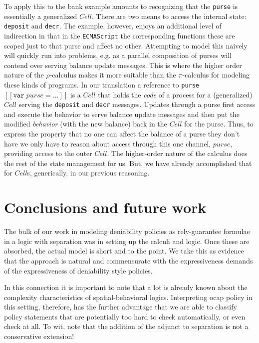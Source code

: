 \documentclass[]{amsart}
\newcommand{\ldb}{[\![}
\newcommand{\rdb}{]\!]}
\newcommand{\meaningof}[1]{\ldb #1 \rdb}
\theoremstyle{definition}
\theoremstyle{remark}
\numberwithin{equation}{subsection}
\newcommand{\pic}{$\pi$-calculus}
\newcommand{\rhoc}{$\rho$-calculus}
\begin{document}
To apply this to the bank example amounts to recognizing that the
\texttt{purse} is essentially a generalized $Cell$. There are two
means to access the internal state: \texttt{deposit} and
\texttt{decr}. The example, however, enjoys an additional level of
indirection in that in the \texttt{ECMAScript} the corresponding
functions these are scoped just to that purse and affect no
other. Attempting to model this naively will quickly run into
problems, e.g.  as a parallel composition of purses will contend over
serving balance update messages. This is where the higher order nature
of the {\rhoc} makes it more suitable than the {\pic} for modeling
these kinds of programs. In our translation a reference to
\texttt{purse} $\meaningof{\texttt{var}\; purse = \ldots}$ is a $Cell$
that holds the \emph{code} of a process for a (generalized) $Cell$
serving the \texttt{deposit} and \texttt{decr} messages. Updates
through a purse first access and execute the behavior to serve balance
update messages and then put the modified \emph{behavior} (with the
new balance) back in the $Cell$ for the purse. Thus, to express the
property that no one can affect the balance of a purse they don't have
\cite{Drossopoulou:2013:NCP:2489804.2489811} we only have to reason
about access through this one channel, $purse$, providing access to
the outer $Cell$. The higher-order nature of the calculus does the
rest of the state management for us. But, we have already accomplished
that for $Cell$s, generically, in our previous reasoning.

\section{Conclusions and future work}

The bulk of our work in modeling deniability policies as
rely-guarantee formulae in a logic with separation was in setting up
the calculi and logic. Once these are absorbed, the actual model is
short and to the point. We take this as evidence that the approach is
natural and commensurate with the expressiveness demands of the
expressiveness of deniability style policies.

In this connection it is important to note that a lot is already known
about the complexity characteristics of spatial-behavioral
logics. Interpreting ocap policy in this setting, therefore, has the
further advantage that we are able to classify policy statements that
are potentially too hard to check automatically, or even check at
all. To wit, \cite{Caires04eliminationof} note that the addition of
the adjunct to separation is not a conservative extension!
\end{document}
